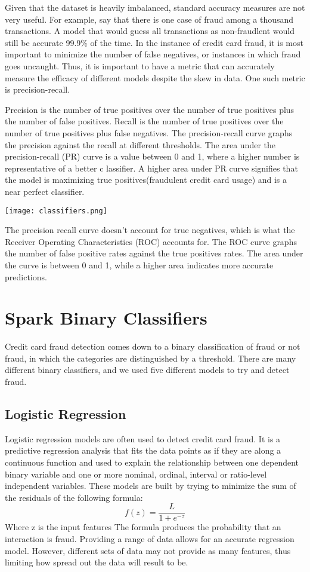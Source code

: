 \documentclass[9pt,twocolumn,twoside]{idsi}
\begin{document}
Given that the dataset is heavily imbalanced, standard accuracy measures are not very useful. For example, say that there is one case of fraud among a thousand transactions. A model that would guess all transactions as non-fraudlent would still be accurate 99.9\% of the time. In the instance of credit card fraud, it is most important to minimize the number of false negatives, or instances in which fraud goes uncaught. 
Thus, it is important to have a metric that can accurately measure the efficacy of different models despite the skew in data. One such metric is precision-recall.
\cite{rocprecisrecall}

Precision is the number of true positives over the number of true positives plus the number of false positives. Recall is the number of true positives over the number of true positives plus false negatives.
The precision-recall curve graphs the precision against the recall at different thresholds. The area under the precision-recall (PR) curve is a value between 0 and 1, where a higher number is representative of a better c lassifier. A higher area under PR curve  signifies that the model is maximizing true positives(fraudulent credit card usage) and is a near perfect classifier. 

\texttt{[image: classifiers.png]}

The precision recall curve doesn't account for true negatives, which is what the Receiver Operating Characteristics (ROC) accounts for. The ROC curve graphs the number of false positive rates against the true positives rates. The area under the curve is between 0 and 1, while a higher area indicates more accurate predictions.

\section{Spark Binary Classifiers}
Credit card fraud detection comes down to a binary classification of fraud or not fraud, in which the categories are distinguished by a threshold. There are many different binary classifiers, and we used five different models to try and detect fraud.
\subsection{Logistic Regression}
Logistic regression models are often used to detect credit card fraud. It is a predictive regression analysis that fits the data points as if they are along a continuous function and used to explain the relationship between one dependent binary variable and one or more nominal, ordinal, interval or ratio-level independent variables. 
These models are built by trying to minimize the sum of the residuals of the following formula:
\begin{equation}
f(z) = \frac{L}{1+e^{-z}}
\end{equation}
Where z is the input features 
The formula produces the probability that an interaction is fraud. Providing a range of data allows for an accurate regression model. However, different sets of data may not provide as many features, thus limiting how spread out the data will result to be. 
\end{document}
